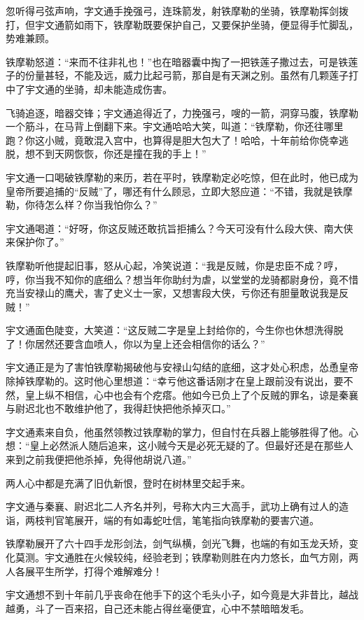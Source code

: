 \documentclass[12pt,oneside]{book}
\begin{document}
忽听得弓弦声响，字文通手挽强弓，连珠箭发，射铁摩勒的坐骑，铁摩勒挥剑拨打，但宇文通箭如雨下，铁摩勒既要保护自己，又要保护坐骑，便显得手忙脚乱，势难兼顾。

铁摩勒怒道：``来而不往非礼也！''也在暗器囊中掏了一把铁莲子撒过去，可是铁莲子的份量甚轻，不能及远，威力比起弓箭，那自是有天渊之别。虽然有几颗莲子打中了宇文通的坐骑，却未能造成伤害。

飞骑追逐，暗器交锋；宇文通追得近了，力挽强弓，嗖的一箭，洞穿马腹，铁摩勒一个筋斗，在马背上倒翻下来。宇文通哈哈大笑，叫道：``铁摩勒，你还往哪里跑？你这小贼，竟敢混入宫中，也算得是胆大包大了！哈哈，十年前给你侥幸逃脱，想不到天网恢恢，你还是撞在我的手上！''

宇文通一口喝破铁摩勒的来历，若在平时，铁摩勒定必吃惊，但在此时，他已成为皇帝所要追捕的``反贼''了，哪还有什么顾忌，立即大怒应道：``不错，我就是铁摩勒，你待怎么样？你当我怕你么？''

宇文通喝道：``好呀，你这反贼还敢抗旨拒捕么？今天可没有什么段大侠、南大侠来保护你了。''

铁摩勒听他提起旧事，怒从心起，冷笑说道：``我是反贼，你是忠臣不成？哼，哼，你当我不知你的底细么？想当年你助纣为虐，以堂堂的龙骑都尉身份，竟不惜充当安禄山的鹰犬，害了史义士一家，又想害段大侠，亏你还有胆量敢说我是反贼！''

宇文通面色陡变，大笑道：``这反贼二字是皇上封给你的，今生你也休想洗得脱了！你居然还要含血喷人，你以为皇上还会相信你的话么？''

宇文通正是为了害怕铁摩勒揭破他与安禄山勾结的底细，这才处心积虑，怂恿皇帝除掉铁摩勒的。这时他心里想道：``幸亏他这番话刚才在皇上跟前没有说出，要不然，皇上纵不相信，心中也会有个疙瘩。他如今已负上了个反贼的罪名，谅是秦襄与尉迟北也不敢维护他了，我得赶快把他杀掉灭口。''

字文通素来自负，他虽然领教过铁摩勒的掌力，但自忖在兵器上能够胜得了他。心想：``皇上必然派人随后追来，这小贼今天是必死无疑的了。但最好还是在那些人来到之前我便把他杀掉，免得他胡说八道。''

两人心中都是充满了旧仇新恨，登时在树林里交起手来。

字文通与秦襄、尉迟北二人齐名并列，号称大内三大高手，武功上确有过人的造诣，两枝判官笔展开，端的有如毒蛇吐信，笔笔指向铁摩勒的要害穴道。

铁摩勒展开了六十四手龙形剑法，剑气纵横，剑光飞舞，也端的有如玉龙夭矫，变化莫测。宇文通胜在火候较纯，经验老到；铁摩勒则胜在内力悠长，血气方刚，两人各展平生所学，打得个难解难分！

宇文通想不到十年前几乎丧命在他手下的这个毛头小子，如今竟是大非昔比，越战越勇，斗了一百来招，自己还未能占得丝毫便宜，心中不禁暗暗发毛。
\end{document}
